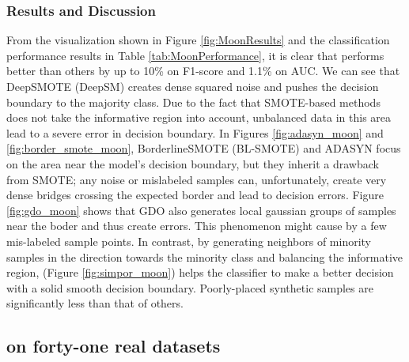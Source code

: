 \subsubsection{Results and Discussion}
From the visualization shown in Figure \ref{fig:MoonResults} and the classification performance results in Table \ref{tab:MoonPerformance}, it is clear that \Methodname{} performs better than others by up to 10\% on F1-score and 1.1\% on AUC. We can see that DeepSMOTE (DeepSM) creates dense squared noise and pushes the decision boundary to the majority class. Due to the fact that SMOTE-based methods does not take the informative region into account, unbalanced data in this area lead to a severe error in decision boundary. In Figures \ref{fig:adasyn_moon} and \ref{fig:border_smote_moon}, BorderlineSMOTE (BL-SMOTE) and ADASYN focus on the area near the model's decision boundary, but they inherit a drawback from SMOTE; any noise or mislabeled samples can, unfortunately, create very dense bridges crossing the expected border and lead to decision errors. Figure \ref{fig:gdo_moon} shows that GDO also generates local gaussian groups of samples near the boder and thus create errors. This phenomenon might cause by a few mis-labeled sample points. In contrast, by generating neighbors of minority samples in the direction towards the minority class and balancing the informative region, \Methodname{} (Figure \ref{fig:simpor_moon}) helps the classifier to make a better decision with a solid smooth decision boundary. Poorly-placed synthetic samples are significantly less than that of others. 


\subsection{\Methodname{} on forty-one real datasets}
\label{subsec:41Datasets}
